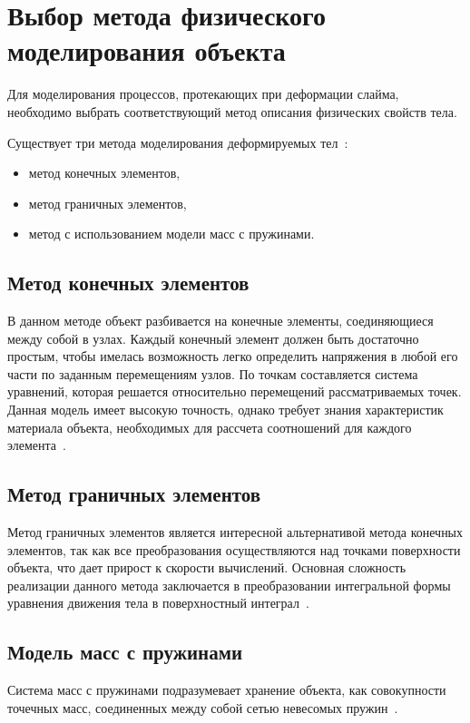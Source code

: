 \section{Выбор метода физического моделирования объекта}

Для моделирования процессов, протекающих при деформации слайма, необходимо выбрать соответствующий метод описания физических свойств тела.

Существует три метода моделирования деформируемых тел~\cite{muller}:

\begin{itemize}
	\item метод конечных элементов,
	\item метод граничных элементов,
	\item метод с использованием модели масс с пружинами.
\end{itemize}

\subsection{Метод конечных элементов}
В данном методе объект разбивается на конечные элементы, соединяющиеся
между собой в узлах. Каждый конечный элемент должен быть достаточно
простым, чтобы имелась возможность легко определить напряжения в любой его части по заданным перемещениям узлов. По точкам составляется система уравнений, которая решается относительно перемещений рассматриваемых точек. Данная модель имеет высокую точность, однако требует знания характеристик материала объекта, необходимых для рассчета соотношений для каждого элемента~\cite{muller}.

\subsection{Метод граничных элементов}
Метод граничных элементов является интересной альтернативой метода
конечных элементов, так как все преобразования осуществляются над точками
поверхности объекта, что дает прирост к скорости вычислений. Основная
сложность реализации данного метода заключается в преобразовании
интегральной формы уравнения движения тела в поверхностный интеграл~\cite{muller}.

\subsection{Модель масс с пружинами}
Система масс с пружинами подразумевает хранение объекта, как совокупности точечных масс, соединенных между собой сетью невесомых пружин~\cite{muller}.

